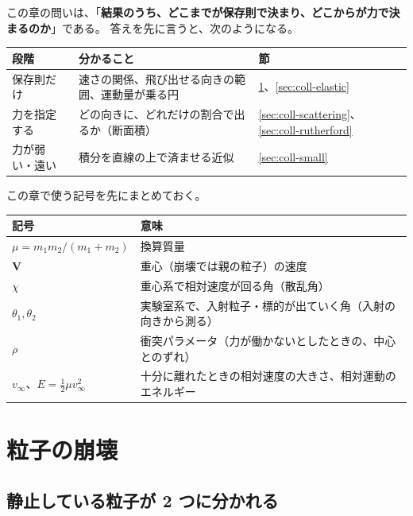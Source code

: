 この章の問いは、「\textbf{結果のうち、どこまでが保存則で決まり、どこからが力で決まるのか}」である。
答えを先に言うと、次のようになる。

\begin{center}
\begin{tabularx}{\linewidth}{@{}lLl@{}}
\toprule
段階 & 分かること & 節 \\
\midrule
保存則だけ & 速さの関係、飛び出せる向きの範囲、運動量が乗る円 & \ref{sec:coll-decay}、\ref{sec:coll-elastic} \\
力を指定する & どの向きに、どれだけの割合で出るか（断面積） & \ref{sec:coll-scattering}、\ref{sec:coll-rutherford} \\
力が弱い・遠い & 積分を直線の上で済ませる近似 & \ref{sec:coll-small} \\
\bottomrule
\end{tabularx}
\end{center}

この章で使う記号を先にまとめておく。

\begin{center}
\begin{tabularx}{\linewidth}{@{}lL@{}}
\toprule
記号 & 意味 \\
\midrule
$\mu=m_1m_2/(m_1+m_2)$ & 換算質量 \\
$\bm V$ & 重心（崩壊では親の粒子）の速度 \\
$\chi$ & 重心系で相対速度が回る角（散乱角） \\
$\theta_1,\theta_2$ & 実験室系で、入射粒子・標的が出ていく角（入射の向きから測る） \\
$\rho$ & 衝突パラメータ（力が働かないとしたときの、中心とのずれ） \\
$v_\infty$、$E=\tfrac12\mu v_\infty^2$ & 十分に離れたときの相対速度の大きさ、相対運動のエネルギー \\
\bottomrule
\end{tabularx}
\end{center}

\section{粒子の崩壊}\label{sec:coll-decay}

\subsection{静止している粒子が 2 つに分かれる}


